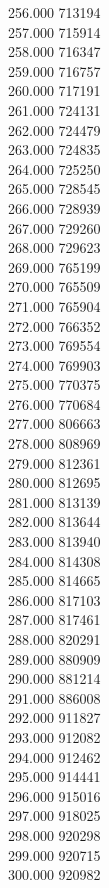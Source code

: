 { 256.000	713194 \\
 257.000	715914 \\
 258.000	716347 \\
 259.000	716757 \\
 260.000	717191 \\
 261.000	724131 \\
 262.000	724479 \\
 263.000	724835 \\
 264.000	725250 \\
 265.000	728545 \\
 266.000	728939 \\
 267.000	729260 \\
 268.000	729623 \\
 269.000	765199 \\
 270.000	765509 \\
 271.000	765904 \\
 272.000	766352 \\
 273.000	769554 \\
 274.000	769903 \\
 275.000	770375 \\
 276.000	770684 \\
 277.000	806663 \\
 278.000	808969 \\
 279.000	812361 \\
 280.000	812695 \\
 281.000	813139 \\
 282.000	813644 \\
 283.000	813940 \\
 284.000	814308 \\
 285.000	814665 \\
 286.000	817103 \\
 287.000	817461 \\
 288.000	820291 \\
 289.000	880909 \\
 290.000	881214 \\
 291.000	886008 \\
 292.000	911827 \\
 293.000	912082 \\
 294.000	912462 \\
 295.000	914441 \\
 296.000	915016 \\
 297.000	918025 \\
 298.000	920298 \\
 299.000	920715 \\
 300.000	920982 \\
}
